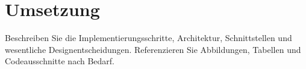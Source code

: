 \section{Umsetzung}

Beschreiben Sie die Implementierungsschritte, Architektur, Schnittstellen und
wesentliche Designentscheidungen. Referenzieren Sie Abbildungen, Tabellen und
Codeausschnitte nach Bedarf.


